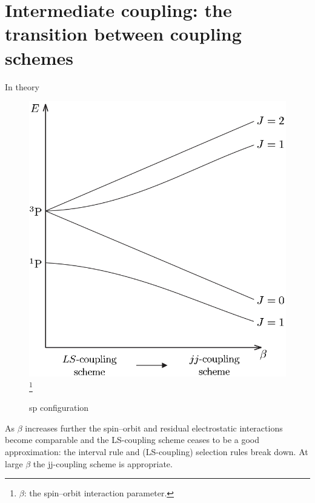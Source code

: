 \section{Intermediate coupling: the transition between coupling schemes}

\begin{frame}{In theory}
    \begin{figure}
        \centering
        \includegraphics[scale=0.3]{fig/fig 5.10.png}
        \footnote{$\beta$: the spin–orbit interaction parameter.}
        \caption{sp configuration}
    \end{figure}
    
    As $\beta$ increases further the spin–orbit and residual electrostatic interactions become comparable and the LS-coupling scheme ceases to be a good approximation: the interval rule and (LS-coupling) selection rules break down. At large $\beta$ the jj-coupling scheme is appropriate.
\end{frame}

